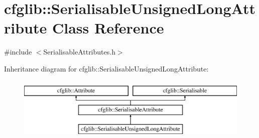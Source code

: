 \hypertarget{classcfglib_1_1SerialisableUnsignedLongAttribute}{}\section{cfglib\+:\+:Serialisable\+Unsigned\+Long\+Attribute Class Reference}
\label{classcfglib_1_1SerialisableUnsignedLongAttribute}


{\ttfamily \#include $<$Serialisable\+Attributes.\+h$>$}

Inheritance diagram for cfglib\+:\+:Serialisable\+Unsigned\+Long\+Attribute\+:\begin{figure}[H]
\begin{center}
\leavevmode
\includegraphics[height=3.000000cm]{classcfglib_1_1SerialisableUnsignedLongAttribute}
\end{center}
\end{figure}
